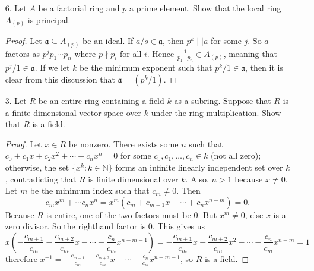 \documentclass[10pt]{article}
\renewcommand{\a}{\mathfrak{a}}
\begin{document}
\begin{enumerate}
\begin{proof}
Finally, let $u(p/1)$ be irreducible, and suppose it divides $\frac{a}{s} \frac{b}{t}$.  We wish to show that $u(p/1)$ divides one of $\frac{a}{s}$ or $\frac{b}{t}$, completing the proof.  We may assume $u=1$ since, in any commutative ring, an element $\alpha$ divides another $\beta$ if and only if $\alpha \cdot u$ divides $\beta$ for all units $u$.  So $\frac{p}{1}\frac{c}{r} = \frac{a}{s} \frac{b}{t}$ for some $r \in S, c \in A$, giving
$$
pstc = rab.
$$
Since $p$ is prime in $A$ but divides no element of $S$, we must have $p \mid a$ or $p \mid b$.  If WLOG $p \mid a$, then $pd = a$ for some $d \in A$.  Thus, $\frac{p}{1}\frac{d}{s} = \frac{a}{s}$, so $\frac{p}{1} \mid \frac{a}{s}$.  Therefore, $u(p/1)$ is prime, and so $S^{-1}A$ is a UFD.
\end{proof}

\item[6.] Let $A$ be a factorial ring and $p$ a prime element.  Show that the local ring $A_{(p)}$ is principal.

\begin{proof}
Let $\a \subseteq A_{(p)}$ be an ideal.  If $a/s \in \a$, then $p^k \mid \mid a$ for some $j$.  So $a$ factors as $p^j p_1 \cdots p_n$ where $p \nmid p_i$ for all $i$.  Hence $\frac{1}{p_1 \cdots p_n} \in A_{(p)}$, meaning that $p^j/1 \in \a$.  If we let $k$ be the minimum exponent such that $p^k/1 \in \a$, then it is clear from this discussion that $\a = (p^k/1)$.
\end{proof}

\item[3.] Let $R$ be an entire ring containing a field $k$ as a subring.  Suppose that $R$ is a finite dimensional vector space over $k$ under the ring multiplication.  Show that $R$ is a field.

\begin{proof}
Let $x \in R$ be nonzero.  There exists some $n$ such that $c_0 + c_1x + c_2x^2 + \cdots + c_n x^n = 0$ for some $c_0, c_1, \dots , c_n \in k$ (not all zero); otherwise, the set $\{x^k : k \in \mathbb{N} \}$ forms an infinite linearly independent set over $k$, contradicting that $R$ is finite dimensional over $k$.  Also, $n > 1$ because $x \neq 0$.  Let $m$ be the minimum index such that $c_m \neq 0$.  Then
$$
c_mx^m + \cdots c_n x^n = x^m ( c_m + c_{m+1}x + \cdots + c_n x^{n-m}) = 0.
$$
Because $R$ is entire, one of the two factors must be $0$.  But $x^m \neq 0$, else $x$ is a zero divisor.  So the righthand factor is $0$.  This gives us
$$
x(-\frac{c_{m+1}}{c_m} -\frac{c_{m+2}}{c_m}x  - \cdots - \frac{c_n}{c_m}x^{n-m-1}) = -\frac{c_{m+1}}{c_m}x -\frac{c_{m+2}}{c_m}x^2 - \cdots - \frac{c_n}{c_m}x^{n-m} = 1
$$
therefore $x^{-1} = -\frac{c_{m+1}}{c_m} -\frac{c_{m+2}}{c_m}x  - \cdots - \frac{c_n}{c_m}x^{n-m-1}$, so $R$ is a field.
\end{proof}


\end{enumerate}
\end{document}
